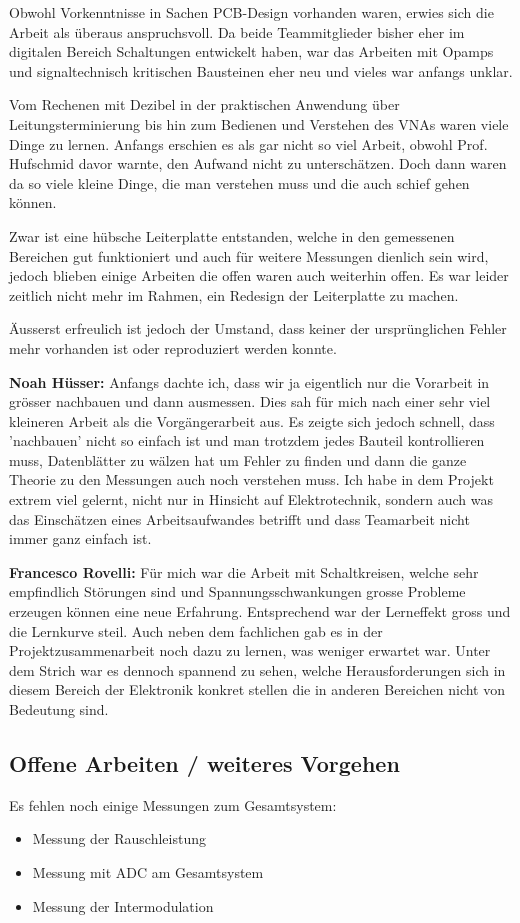 Obwohl Vorkenntnisse in Sachen PCB-Design vorhanden waren, erwies sich die Arbeit als überaus anspruchsvoll. Da beide Teammitglieder bisher eher im digitalen Bereich Schaltungen entwickelt haben, war das Arbeiten mit Opamps und signaltechnisch kritischen Bausteinen eher neu und vieles war anfangs unklar.

Vom Rechenen mit Dezibel in der praktischen Anwendung über Leitungsterminierung bis hin zum Bedienen und Verstehen des VNAs waren viele Dinge zu lernen. Anfangs erschien es als gar nicht so viel Arbeit, obwohl Prof. Hufschmid davor warnte, den Aufwand nicht zu unterschätzen. Doch dann waren da so viele kleine Dinge, die man verstehen muss und die auch schief gehen können.

Zwar ist eine hübsche Leiterplatte entstanden, welche in den gemessenen Bereichen gut funktioniert und auch für weitere Messungen dienlich sein wird, jedoch blieben einige Arbeiten die offen waren auch weiterhin offen. Es war leider zeitlich nicht mehr im Rahmen, ein Redesign der Leiterplatte zu machen.

Äusserst erfreulich ist jedoch der Umstand, dass keiner der ursprünglichen Fehler mehr vorhanden ist oder reproduziert werden konnte.

\textbf{Noah Hüsser:} Anfangs dachte ich, dass wir ja eigentlich nur die Vorarbeit in grösser nachbauen und dann ausmessen. Dies sah für mich nach einer sehr viel kleineren Arbeit als die Vorgängerarbeit aus. Es zeigte sich jedoch schnell, dass 'nachbauen' nicht so einfach ist und man trotzdem jedes Bauteil kontrollieren muss, Datenblätter zu wälzen hat um Fehler zu finden und dann die ganze Theorie zu den Messungen auch noch verstehen muss. Ich habe in dem Projekt extrem viel gelernt, nicht nur in Hinsicht auf Elektrotechnik, sondern auch was das Einschätzen eines Arbeitsaufwandes betrifft und dass Teamarbeit nicht immer ganz einfach ist.

\textbf{Francesco Rovelli:} Für mich war die Arbeit mit Schaltkreisen, welche sehr empfindlich Störungen sind und Spannungsschwankungen grosse Probleme erzeugen können eine neue Erfahrung. Entsprechend war der Lerneffekt gross und die Lernkurve steil. Auch neben dem fachlichen gab es in der Projektzusammenarbeit noch dazu zu lernen, was weniger erwartet war. Unter dem Strich war es dennoch spannend zu sehen, welche Herausforderungen sich in diesem Bereich der Elektronik konkret stellen die in anderen Bereichen nicht von Bedeutung sind.

\subsection*{Offene Arbeiten / weiteres Vorgehen}
Es fehlen noch einige Messungen zum Gesamtsystem:
\begin{itemize}
    \item Messung der Rauschleistung
    \item Messung mit ADC am Gesamtsystem
    \item Messung der Intermodulation
\end{itemize}

